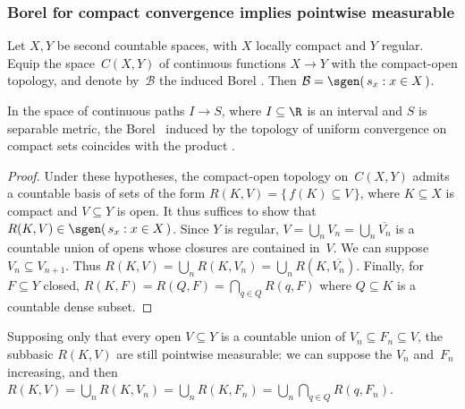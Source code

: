 \subsubsection
	{Borel for compact convergence implies pointwise measurable}

\begin	{theorem}
Let $X,Y$ be second countable spaces,
with $X$ locally compact and $Y$ regular.
Equip the space~$C(X,Y)$ of continuous functions \( X \to Y \)
with the compact-open topology,
and denote by~$\mathcal B$ the induced Borel \salg.
Then \( \mathcal B = \sgen(\, s_x : x \in X \,) \).
\end	{theorem}

\begin	{corollary}
In the space of continuous paths \( I \to S \),
where \( I \subseteq \R \) is an interval and $S$ is separable metric,
the Borel \salg\ induced by the topology of uniform convergence on compact sets
coincides with the product \salg.
\end	{corollary}

\begin	{proof}
Under these hypotheses,
the compact-open topology on~$C(X,Y)$ admits a countable basis
of sets of the form \( R(K,V) = \{\, f(K) \subseteq V \,\} \),
where \( K \subseteq X \) is compact and \( V \subseteq Y \) is open.
It thus suffices to show that \( R(K,V) \in \sgen(\, s_x : x \in X \,) \).
Since $Y$ is regular,
\( V = \bigcup_n V_n = \bigcup_n \overline{V_n} \)
is a countable union of opens whose closures are contained in~$V$.
We can suppose \( V_n \subseteq V_{n+1} \).
Thus \( R(K,V) = \bigcup_n R(K,V_n) = \bigcup_n R(K,\overline{V_n}) \).
Finally, for \( F \subseteq Y \) closed,
\( R(K,F) = R(Q,F) = \bigcap_{q \in Q} R(q,F) \)
where \( Q \subseteq K \) is a countable dense subset.
\end	{proof}

\begin	{remark}
\label	{thm:co-subbasic-pointwise-measurable}
Supposing only that every open \( V \subseteq Y \)
is a countable union of \( V_n \subseteq F_n \subseteq V \),
the subbasic \( R(K,V) \) are still pointwise measurable:
we can suppose the $V_n$ and~$F_n$ increasing, and then
\( R(K,V) = \bigcup_n R(K,V_n) = \bigcup_n R(K,F_n) =
	\bigcup_n \bigcap_{q \in Q} R(q,F_n) \).
\end	{remark}
